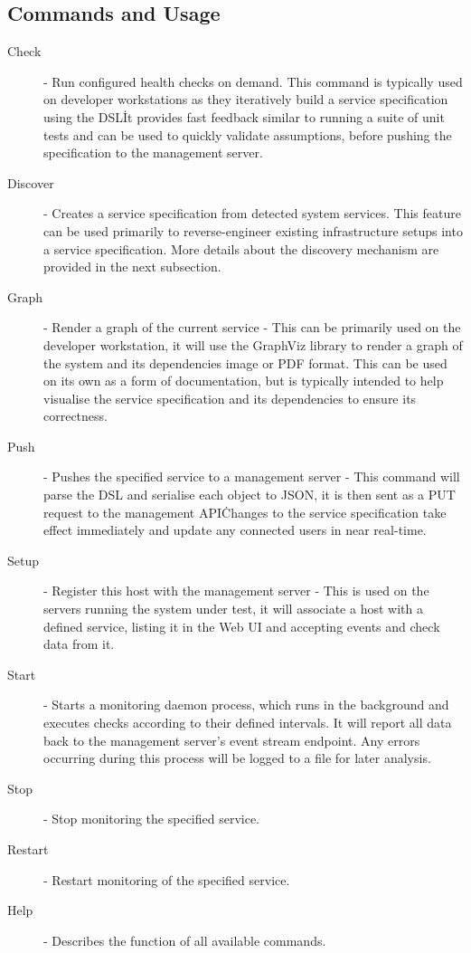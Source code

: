 \documentclass{cshonours}
\begin{document}
\subsection{Commands and Usage}

\begin{description}
  \item[Check] - Run configured health checks on demand. This command is typically used on developer workstations as they iteratively build a service specification using the DSL\. It provides fast feedback similar to running a suite of unit tests and can be used to quickly validate assumptions, before pushing the specification to the management server.
  \item[Discover] - Creates a service specification from detected system services. This feature can be used primarily to reverse-engineer existing infrastructure setups into a service specification. More details about the discovery mechanism are provided in the next subsection.
  \item[Graph] - Render a graph of the current service - This can be primarily used on the developer workstation, it will use the GraphViz library to render a graph of the system and its dependencies image or PDF format. This can be used on its own as a form of documentation, but is typically intended to help visualise the service specification and its dependencies to ensure its correctness.
  \item[Push] - Pushes the specified service to a management server - This command will parse the DSL and serialise each object to JSON, it is then sent as a PUT request to the management API\. Changes to the service specification take effect immediately and update any connected users in near real-time.
  \item[Setup] - Register this host with the management server - This is used on the servers running the system under test, it will associate a host with a defined service, listing it in the Web UI and accepting events and check data from it.
  \item[Start] - Starts a monitoring daemon process, which runs in the background and executes checks according to their defined intervals. It will report all data back to the management server's event stream endpoint. Any errors occurring during this process will be logged to a file for later analysis.
  \item[Stop] - Stop monitoring the specified service.
  \item[Restart] - Restart monitoring of the specified service.
  \item[Help] - Describes the function of all available commands.
\end{description}
\end{document}
